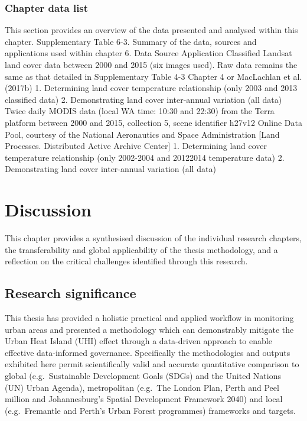 \documentclass[]{book}
\begin{document}
\subsection{Chapter data list}\label{chapter-data-list-2}

This section provides an overview of the data presented and analysed
within this chapter. Supplementary Table 6-3. Summary of the data,
sources and applications used within chapter 6. Data Source Application
Classified Landsat land cover data between 2000 and 2015 (six images
used). Raw data remains the same as that detailed in Supplementary Table
4-3 Chapter 4 or MacLachlan et al. (2017b) 1. Determining land cover
temperature relationship (only 2003 and 2013 classified data) 2.
Demonstrating land cover inter-annual variation (all data) Twice daily
MODIS data (local WA time: 10:30 and 22:30) from the Terra platform
between 2000 and 2015, collection 5, scene identifier h27v12 Online Data
Pool, courtesy of the National Aeronautics and Space Administration
{[}Land Processes. Distributed Active Archive Center{]} 1. Determining
land cover temperature relationship (only 2002-2004 and 20122014
temperature data) 2. Demonstrating land cover inter-annual variation
(all data)

\chapter{Discussion}\label{discussion-3}

This chapter provides a synthesised discussion of the individual
research chapters, the transferability and global applicability of the
thesis methodology, and a reflection on the critical challenges
identified through this research.

\section{Research significance}\label{research-significance}

This thesis has provided a holistic practical and applied workflow in
monitoring urban areas and presented a methodology which can
demonstrably mitigate the Urban Heat Island (UHI) effect through a
data-driven approach to enable effective data-informed governance.
Specifically the methodologies and outputs exhibited here permit
scientifically valid and accurate quantitative comparison to global
(e.g.~Sustainable Development Goals (SDGs) and the United Nations (UN)
Urban Agenda), metropolitan (e.g.~The London Plan, Perth and Peel
\citet{3.5} million and Johannesburg's Spatial Development Framework
2040) and local (e.g.~Fremantle and Perth's Urban Forest programmes)
frameworks and targets.
\end{document}

